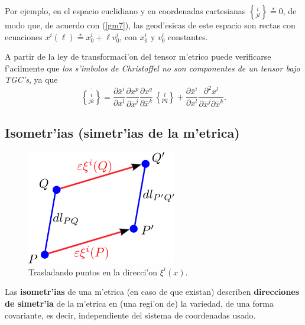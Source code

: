Por ejemplo, en el espacio euclidiano y en coordenadas cartesianas
$\left\{_{ j l}^{\, i}\right\}\overset{\ast}{=}0$, de modo que, de acuerdo con
(\ref{gm7}), las geod'esicas de este espacio son rectas con ecuaciones
$x^i (\ell)\overset{\ast}{=}x_0^i +\ell v_0^i $, con $x_0^i $ y $v_0^i$ constantes.

A partir de la ley de transformaci'on del tensor m'etrico puede verificarse f'acilmente que \textit{los s'imbolos de Christoffel no son componentes de un tensor bajo TGC's}, ya que
\begin{equation}
\overline{\left\{_{j k}^{\,\, i}\right\}}=\frac{\partial\bar{x}^i}{\partial x^l }\frac{\partial
x^p}{\partial\bar{x}^j }\frac{\partial x^q}{\partial\bar{x}^k }\,
\left\{_{p q}^{\,\, l}\right\} +\frac{\partial\bar{x}^i}{\partial x^l }\frac{\partial
^2x^l }{\partial\bar{x}^j \partial\bar{x}^k }. \label{dinv7}
\end{equation}

\subsection{Isometr'ias (simetr'ias de la m'etrica)}
\begin{center}
\begin{figure}[H]
\centerline{\includegraphics[height=5cm]{fig/fig-Killing.pdf}}
\caption{Trasladando puntos en la direcci'on $\xi^i(x)$.}
\label{fig:Killing}
\end{figure}
\end{center}
Las \textbf{isometr'ias} de una m'etrica (en caso de que existan) describen \textbf{direcciones de simetr'ia} de la m'etrica en (una regi'on de) la variedad, de una forma covariante, es decir, independiente del sistema de coordenadas usado. 

